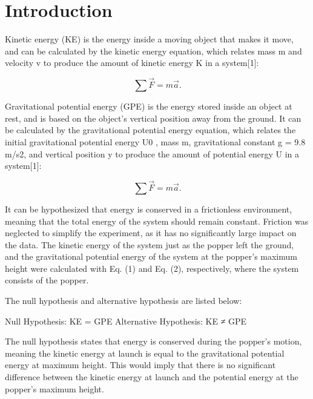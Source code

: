 \documentclass[amsmath,amssymb,aps,endfloats,linenumbers]{revtex4-2}
\begin{document}
\section{Introduction}
Kinetic energy (KE) is the energy inside a moving object that makes it move, and can be calculated by the kinetic energy equation, which relates mass m and velocity v to produce the amount of kinetic energy K in a system[1]:

\begin{equation}
\sum \vec{F} = m \vec{a}. %
\label{eq:fma} %
\end{equation}

Gravitational potential energy (GPE) is the energy stored inside an object at rest, and is based on the object's vertical position away from the ground. It can be calculated by the gravitational potential energy equation, which relates the initial gravitational potential energy U0 , mass m, gravitational constant g = 9.8 m/s2, and vertical position y to produce the amount of potential energy U in a system[1]:

\begin{equation}
\sum \vec{F} = m \vec{a}. %
\label{eq:fma} %
\end{equation}

It can be hypothesized that energy is conserved in a frictionless environment, meaning that the total energy of the system should remain constant. Friction was neglected to simplify the experiment, as it has no significantly large impact on the data. The kinetic energy of the system just as the popper left the ground, and the gravitational potential energy of the system at the popper's maximum height were calculated with Eq. (1) and Eq. (2), respectively, where the system consists of the popper.

The null hypothesis and alternative hypothesis are listed below:

Null Hypothesis: KE = GPE
Alternative Hypothesis: KE ≠ GPE

The null hypothesis states that energy is conserved during the popper’s motion, meaning the kinetic energy at launch is equal to the gravitational potential energy at maximum height. This would imply that there is no significant difference between the kinetic energy at launch and the potential energy at the popper’s maximum height.
\end{document}
